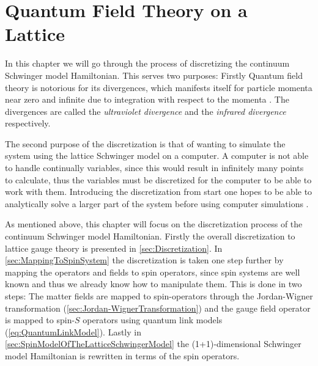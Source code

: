 \documentclass[../main.tex]{subfiles} %
\begin{document}
\chapter{Quantum Field Theory on a Lattice} \label{chap:LatticeQFT}

In this chapter we will go through the process of discretizing the continuum Schwinger model Hamiltonian. This serves two purposes: Firstly Quantum field theory is notorious for its divergences, which manifests itself for particle momenta near zero and infinite due to integration with respect to the momenta \cite{peskin_introToQFT_1995, panyella_masterThesis_2019}. The divergences are called the \emph{ultraviolet divergence} and the \emph{infrared divergence} respectively.


The second purpose of the discretization is that of wanting to simulate the system using the lattice Schwinger model on a computer. A computer is not able to handle continually variables, since this would result in infinitely many points to calculate, thus the variables must be discretized for the computer to be able to work with them. Introducing the discretization from start one hopes to be able to analytically solve a larger part of the system before using computer simulations \cite{panyella_masterThesis_2019}.

As mentioned above, this chapter will focus on the discretization process of the continuum Schwinger model Hamiltonian. Firstly the overall discretization to lattice gauge theory is presented in \cref{sec:Discretization}. In \cref{sec:MappingToSpinSystem} the discretization is taken one step further by mapping the operators and fields to spin operators, since spin systems are well known and thus we already know how to manipulate them. This is done in two steps: The matter fields are mapped to spin-\half operators through the Jordan-Wigner transformation (\cref{sec:Jordan-WignerTransformation}) and the gauge field operator is mapped to spin-$S$ operators using quantum link models (\cref{eq:QuantumLinkModel}). Lastly in \cref{sec:SpinModelOfTheLatticeSchwingerModel} the (1+1)-dimensional Schwinger model Hamiltonian is rewritten in terms of the spin operators.
\end{document}
